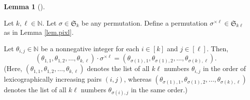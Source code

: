 \documentclass[numbers=enddot,12pt,final,onecolumn,notitlepage]{scrartcl}%
\theoremstyle{definition}
\newtheorem{lem}[theo]{Lemma}
\newenvironment{lemma}[1][]
{\begin{lem}[#1]\begin{leftbar}}
{\end{leftbar}\end{lem}}
\begin{document}
\begin{lemma}
\label{lem.tup-sigma}Let $k,\ell\in\mathbb{N}$. Let $\sigma\in\mathfrak{S}%
_{k}$ be any permutation. Define a permutation $\sigma^{\times\ell}%
\in\mathfrak{S}_{k\ell}$ as in Lemma \ref{lem.pixl}.

Let $\theta_{i,j}\in\mathbb{N}$ be a nonnegative integer for each $i\in\left[
k\right]  $ and $j\in\left[  \ell\right]  $. Then,%
\[
\left(  \theta_{1,1},\theta_{1,2},\ldots,\theta_{k,\ell}\right)  \cdot
\sigma^{\times\ell}=\left(  \theta_{\sigma\left(  1\right)  ,1},\theta
_{\sigma\left(  1\right)  ,2},\ldots,\theta_{\sigma\left(  k\right)  ,\ell
}\right)  .
\]
(Here, $\left(  \theta_{1,1},\theta_{1,2},\ldots,\theta_{k,\ell}\right)  $
denotes the list of all $k\ell$ numbers $\theta_{i,j}$ in the order of
lexicographically increasing pairs $\left(  i,j\right)  $, whereas $\left(
\theta_{\sigma\left(  1\right)  ,1},\theta_{\sigma\left(  1\right)  ,2}%
,\ldots,\theta_{\sigma\left(  k\right)  ,\ell}\right)  $ denotes the list of
all $k\ell$ numbers $\theta_{\sigma\left(  i\right)  ,j}$ in the same order.)
\end{lemma}
\end{document}
